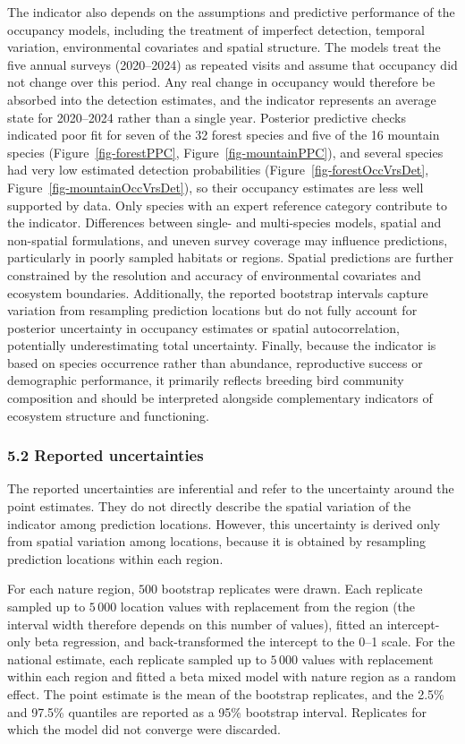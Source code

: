 \documentclass[
  letterpaper,
  DIV=11,
  numbers=noendperiod]{scrartcl}
\begin{document}
The indicator also depends on the assumptions and predictive performance
of the occupancy models, including the treatment of imperfect detection,
temporal variation, environmental covariates and spatial structure. The
models treat the five annual surveys (2020--2024) as repeated visits and
assume that occupancy did not change over this period. Any real change
in occupancy would therefore be absorbed into the detection estimates,
and the indicator represents an average state for 2020--2024 rather than
a single year. Posterior predictive checks indicated poor fit for seven
of the 32 forest species and five of the 16 mountain species
(Figure~\ref{fig-forestPPC}, Figure~\ref{fig-mountainPPC}), and several
species had very low estimated detection probabilities
(Figure~\ref{fig-forestOccVrsDet}, Figure~\ref{fig-mountainOccVrsDet}),
so their occupancy estimates are less well supported by data. Only
species with an expert reference category contribute to the indicator.
Differences between single- and multi-species models, spatial and
non-spatial formulations, and uneven survey coverage may influence
predictions, particularly in poorly sampled habitats or regions. Spatial
predictions are further constrained by the resolution and accuracy of
environmental covariates and ecosystem boundaries. Additionally, the
reported bootstrap intervals capture variation from resampling
prediction locations but do not fully account for posterior uncertainty
in occupancy estimates or spatial autocorrelation, potentially
underestimating total uncertainty. Finally, because the indicator is
based on species occurrence rather than abundance, reproductive success
or demographic performance, it primarily reflects breeding bird
community composition and should be interpreted alongside complementary
indicators of ecosystem structure and functioning.

\subsubsection{5.2 Reported uncertainties}\label{reported-uncertainties}

The reported uncertainties are inferential and refer to the uncertainty
around the point estimates. They do not directly describe the spatial
variation of the indicator among prediction locations. However, this
uncertainty is derived only from spatial variation among locations,
because it is obtained by resampling prediction locations within each
region.

For each nature region, \(500\) bootstrap replicates were drawn. Each
replicate sampled up to \(5\,000\) location values with replacement from
the region (the interval width therefore depends on this number of
values), fitted an intercept-only beta regression, and back-transformed
the intercept to the 0--1 scale. For the national estimate, each
replicate sampled up to \(5\,000\) values with replacement within each
region and fitted a beta mixed model with nature region as a random
effect. The point estimate is the mean of the bootstrap replicates, and
the 2.5\% and 97.5\% quantiles are reported as a 95\% bootstrap
interval. Replicates for which the model did not converge were
discarded.
\end{document}
